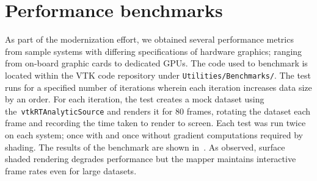 \section{Performance benchmarks}
\label{performance-benchmarks}
As part of the modernization effort, we obtained several performance metrics
from sample systems with differing specifications of hardware graphics; ranging
from on-board graphic cards to dedicated GPUs. The code used to benchmark is
located within the VTK code repository under \texttt{Utilities/Benchmarks/}. The
test runs for a specified number of iterations wherein each iteration increases
data size by an order. For each iteration, the test creates a mock dataset using
the~\texttt{vtkRTAnalyticSource} and renders it for 80 frames, rotating the
dataset each frame and recording the time taken to render to screen.  Each test
was run twice on each system; once with and once without gradient computations
required by shading. The results of the benchmark are shown
in~. As observed, surface shaded rendering degrades
performance but the mapper maintains interactive frame rates even for large
datasets.

